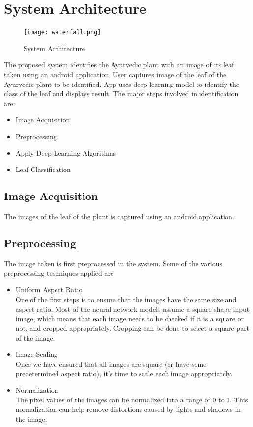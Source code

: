 \section{System Architecture}
\begin{figure}[h]
	\label{ss}
	\centering
	\texttt{[image: waterfall.png]}
	\caption{System Architecture}
\end{figure}
The proposed system identifies the Ayurvedic plant with an image of its leaf taken using an android application.
User captures image of the leaf of the Ayurvedic plant to be identified.
App uses deep learning model to identify the class of the leaf and displays result. The major steps involved in identification are:
\begin{itemize}
 \item Image Acquisition
 \item  Preprocessing
 \item Apply Deep Learning Algorithms
 \item Leaf Classification
\end{itemize}


\subsection{Image Acquisition }
The images of the leaf of the plant is captured using an android application.
\subsection{Preprocessing}
The image taken is first preprocessed in the system. Some of the various preprocessing techniques applied are
\begin{itemize}
    \item{Uniform Aspect Ratio}\\One of the first steps is to ensure that the images have the same size and aspect ratio. Most of the neural network models assume a square shape input image, which means that each image needs to be checked if it is a square or not, and cropped appropriately. Cropping can be done to select a square part of the image.
    \item{Image Scaling}\\Once we have ensured that all images are square (or have some predetermined aspect ratio), it’s time to scale each image appropriately. 
    \item{Normalization}\\The pixel values of the images can be normalized into a range of 0 to 1. This normalization can help remove distortions caused by lights and shadows in the image.
\end{itemize}
